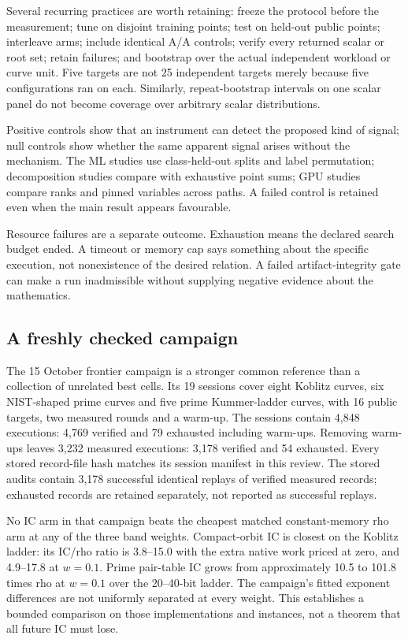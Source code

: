 Several recurring practices are worth retaining: freeze the protocol
before the measurement; tune on disjoint training points; test on held-out
public points; interleave arms; include identical A/A controls; verify
every returned scalar or root set; retain failures; and bootstrap over the
actual independent workload or curve unit. Five targets are not 25
independent targets merely because five configurations ran on each.
Similarly, repeat-bootstrap intervals on one scalar panel do not become
coverage over arbitrary scalar distributions.

Positive controls show that an instrument can detect the proposed kind of
signal; null controls show whether the same apparent signal arises without
the mechanism. The ML studies use class-held-out splits and label
permutation; decomposition studies compare with exhaustive point sums;
GPU studies compare ranks and pinned variables across paths. A failed
control is retained even when the main result appears favourable.

Resource failures are a separate outcome. Exhaustion means the declared
search budget ended. A timeout or memory cap says something about the
specific execution, not nonexistence of the desired relation. A failed
artifact-integrity gate can make a run inadmissible without supplying
negative evidence about the mathematics.

\subsection{A freshly checked campaign}

The 15 October frontier campaign is a stronger common reference than a
collection of unrelated best cells. Its 19 sessions cover eight Koblitz
curves, six NIST-shaped prime curves and five prime Kummer-ladder curves,
with 16 public targets, two measured rounds and a warm-up. The sessions
contain 4,848 executions: 4,769 verified and 79 exhausted including
warm-ups. Removing warm-ups leaves 3,232 measured executions: 3,178
verified and 54 exhausted. Every stored record-file hash matches its
session manifest in this review. The stored audits contain 3,178
successful identical replays of verified measured records; exhausted
records are retained separately, not reported as successful replays.

No IC arm in that campaign beats the cheapest matched constant-memory
rho arm at any of the three band weights. Compact-orbit IC is closest on
the Koblitz ladder: its IC/rho ratio is 3.8--15.0 with the extra native
work priced at zero, and 4.9--17.8 at $w=0.1$. Prime pair-table IC grows
from approximately 10.5 to 101.8 times rho at $w=0.1$ over the
20--40-bit ladder. The campaign's fitted exponent differences are not
uniformly separated at every weight. This establishes a bounded
comparison on those implementations and instances, not a theorem that all
future IC must lose.

